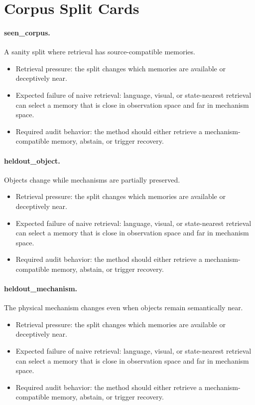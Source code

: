 \documentclass{article}
\begin{document}
\section{Corpus Split Cards}
\paragraph{seen\_corpus.} A sanity split where retrieval has source-compatible memories.
\begin{itemize}
\item Retrieval pressure: the split changes which memories are available or deceptively near.
\item Expected failure of naive retrieval: language, visual, or state-nearest retrieval can select a memory that is close in observation space and far in mechanism space.
\item Required audit behavior: the method should either retrieve a mechanism-compatible memory, abstain, or trigger recovery.
\end{itemize}
\paragraph{heldout\_object.} Objects change while mechanisms are partially preserved.
\begin{itemize}
\item Retrieval pressure: the split changes which memories are available or deceptively near.
\item Expected failure of naive retrieval: language, visual, or state-nearest retrieval can select a memory that is close in observation space and far in mechanism space.
\item Required audit behavior: the method should either retrieve a mechanism-compatible memory, abstain, or trigger recovery.
\end{itemize}
\paragraph{heldout\_mechanism.} The physical mechanism changes even when objects remain semantically near.
\begin{itemize}
\item Retrieval pressure: the split changes which memories are available or deceptively near.
\item Expected failure of naive retrieval: language, visual, or state-nearest retrieval can select a memory that is close in observation space and far in mechanism space.
\item Required audit behavior: the method should either retrieve a mechanism-compatible memory, abstain, or trigger recovery.
\end{itemize}
\end{document}
